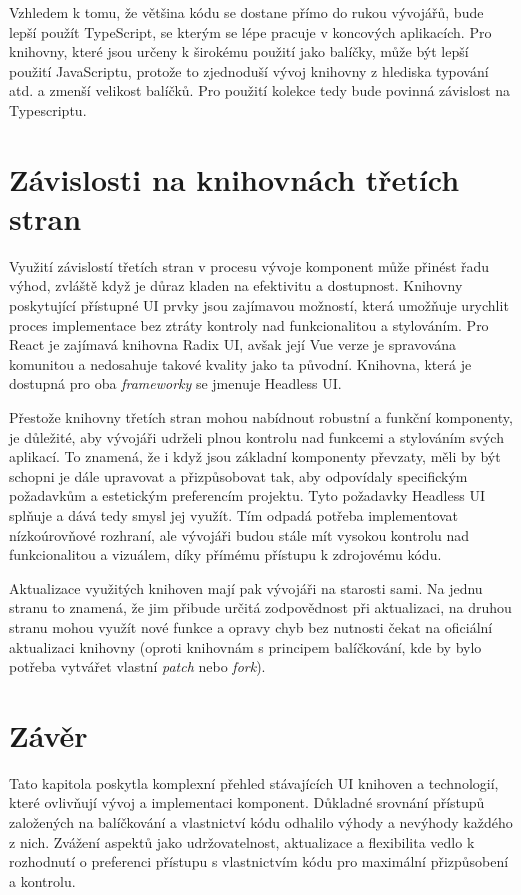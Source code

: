 Vzhledem k tomu, že většina kódu se dostane přímo do rukou vývojářů, bude lepší použít TypeScript, se kterým se lépe pracuje v koncových aplikacích. Pro knihovny, které jsou určeny k širokému použití jako balíčky, může být lepší použití JavaScriptu, protože to zjednoduší vývoj knihovny z hlediska typování atd. a zmenší velikost balíčků. Pro použití kolekce tedy bude povinná závislost na Typescriptu.


\section{Závislosti na knihovnách třetích stran}
Využití závislostí třetích stran v procesu vývoje komponent může přinést řadu výhod, zvláště když je důraz kladen na efektivitu a dostupnost. Knihovny poskytující přístupné UI prvky jsou zajímavou možností, která umožňuje urychlit proces implementace bez ztráty kontroly nad funkcionalitou a stylováním. Pro React je zajímavá knihovna Radix UI, avšak její Vue verze je spravována komunitou a nedosahuje takové kvality jako ta původní. Knihovna, která je dostupná pro oba \emph{frameworky} se jmenuje Headless UI.

Přestože knihovny třetích stran mohou nabídnout robustní a funkční komponenty, je důležité, aby vývojáři udrželi plnou kontrolu nad funkcemi a stylováním svých aplikací. To znamená, že i když jsou základní komponenty převzaty, měli by být schopni je dále upravovat a přizpůsobovat tak, aby odpovídaly specifickým požadavkům a estetickým preferencím projektu. Tyto požadavky Headless UI splňuje a dává tedy smysl jej využít. Tím odpadá potřeba implementovat nízkoúrovňové rozhraní, ale vývojáři budou stále mít vysokou kontrolu nad funkcionalitou a vizuálem, díky přímému přístupu k zdrojovému kódu.

Aktualizace využitých knihoven mají pak vývojáři na starosti sami. Na jednu stranu to znamená, že jim přibude určitá zodpovědnost při aktualizaci, na druhou stranu mohou využít nové funkce a opravy chyb bez nutnosti čekat na oficiální aktualizaci knihovny (oproti knihovnám s principem balíčkování, kde by bylo potřeba vytvářet vlastní \emph{patch} nebo \emph{fork}).

\section{Závěr}
Tato kapitola poskytla komplexní přehled stávajících UI knihoven a technologií, které ovlivňují vývoj a implementaci komponent. Důkladné srovnání přístupů založených na balíčkování a vlastnictví kódu odhalilo výhody a nevýhody každého z nich. Zvážení aspektů jako udržovatelnost, aktualizace a flexibilita vedlo k rozhodnutí o preferenci přístupu s vlastnictvím kódu pro maximální přizpůsobení a kontrolu.

